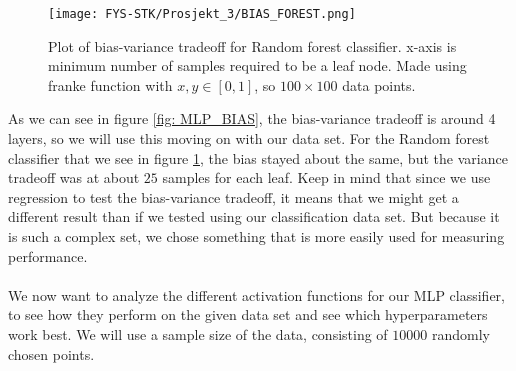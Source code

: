 \documentclass[english,notitlepage,reprint,nofootinbib]{revtex4-1}  %
\begin{document}
\begin{figure}[H]
    \centering
    \texttt{[image: FYS-STK/Prosjekt\_3/BIAS\_FOREST.png]}
    \caption{Plot of bias-variance tradeoff for Random forest classifier. x-axis is minimum number of samples required to be a leaf node. Made using franke function with $x,y \in [0,1]$, so $100 \times 100$ data points.}
    \label{fig: FOREST_BIAS}
\end{figure}

As we can see in figure \ref{fig: MLP_BIAS}, the bias-variance tradeoff is around 4 layers, so we will use this moving on with our data set. For the Random forest classifier that we see in figure \ref{fig: FOREST_BIAS}, the bias stayed about the same, but the variance tradeoff was at about $25$ samples for each leaf. Keep in mind that since we use regression to test the bias-variance tradeoff, it means that we might get a different result than if we tested using our classification data set. But because it is such a complex set, we chose something that is more easily used for measuring performance. 
\\
\\
We now want to analyze the different activation functions for our MLP classifier, to see how they perform on the given data set and see which hyperparameters work best. We will use a sample size of the data, consisting of $10 000$ randomly chosen points. %
\end{document}
